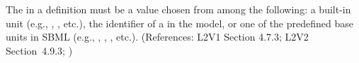 The  in a \Parameter definition must be a value chosen from
among the following: a built-in unit (e.g., , ,
etc.), the identifier of a \UnitDefinition in the model, or one of the
predefined base units in SBML (e.g., , , ,
etc.).  (References: L2V1 Section 4.7.3; L2V2 Section~4.9.3; )
